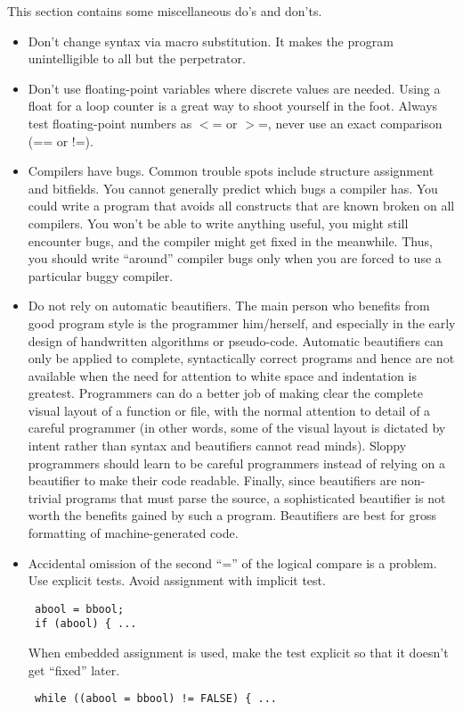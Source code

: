  This section contains some miscellaneous do's and don'ts. 
\begin{itemize}
\item Don't change syntax via macro substitution. It makes the program
unintelligible to all but the perpetrator. 

\item Don't use floating-point variables where discrete values are needed. Using
a float for a loop counter is a great way to shoot yourself in the foot.
Always test floating-point numbers as $<$= or $>$=, never use an exact
comparison (== or !=). 

\item Compilers have bugs. Common trouble spots include structure assignment and
bitfields.  You cannot generally predict which bugs a compiler has. You could
write a program that avoids all constructs that are known broken on all
compilers. You won't be able to write anything useful, you might still
encounter bugs, and the compiler might get fixed in the meanwhile. Thus, you
should write ``around'' compiler bugs only when you are forced to use a
particular buggy compiler.

\item Do not rely on automatic beautifiers. The main person who benefits from
good program style is the programmer him/herself, and especially in the early
design of handwritten algorithms or pseudo-code. Automatic beautifiers can
only be applied to complete, syntactically correct programs and hence are
not available when the need for attention to  white space and indentation is
greatest. Programmers can do a better job of making clear the complete visual
layout of a function or file, with the normal attention to detail of a careful
programmer (in other words, some of the visual layout is dictated by intent
rather than syntax and beautifiers cannot read minds). Sloppy programmers
should learn to be careful programmers instead of relying on a beautifier to
make their code readable.  Finally, since beautifiers are non-trivial programs
that must parse the source, a sophisticated beautifier is not worth the
benefits gained by such a program. Beautifiers are best for gross formatting
of machine-generated code. 

\item Accidental omission of the second ``='' of the logical compare is a
problem. Use explicit tests. Avoid assignment with implicit test.
\begin{verbatim}
 abool = bbool;
 if (abool) { ... 
\end{verbatim}
 When embedded assignment is used, make the test explicit so that it doesn't
get ``fixed''  later. 
\begin{verbatim}
 while ((abool = bbool) != FALSE) { ... 



\end{verbatim}
\end{itemize}

